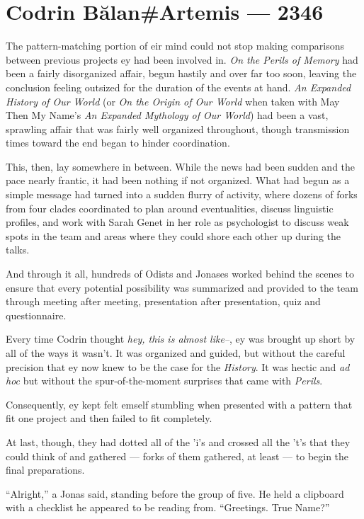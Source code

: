 \hypertarget{codrin-bux103lanartemis-2346}{%
\chapter{Codrin Bălan\#Artemis — 2346}\label{codrin-bux103lanartemis-2346}}

The pattern-matching portion of eir mind could not stop making comparisons between previous projects ey had been involved in. \emph{On the Perils of Memory} had been a fairly disorganized affair, begun hastily and over far too soon, leaving the conclusion feeling outsized for the duration of the events at hand. \emph{An Expanded History of Our World} (or \emph{On the Origin of Our World} when taken with May Then My Name's \emph{An Expanded Mythology of Our World}) had been a vast, sprawling affair that was fairly well organized throughout, though transmission times toward the end began to hinder coordination.

This, then, lay somewhere in between. While the news had been sudden and the pace nearly frantic, it had been nothing if not organized. What had begun as a simple message had turned into a sudden flurry of activity, where dozens of forks from four clades coordinated to plan around eventualities, discuss linguistic profiles, and work with Sarah Genet in her role as psychologist to discuss weak spots in the team and areas where they could shore each other up during the talks.

And through it all, hundreds of Odists and Jonases worked behind the scenes to ensure that every potential possibility was summarized and provided to the team through meeting after meeting, presentation after presentation, quiz and questionnaire.

Every time Codrin thought \emph{hey, this is almost like--}, ey was brought up short by all of the ways it wasn't. It was organized and guided, but without the careful precision that ey now knew to be the case for the \emph{History}. It was hectic and \emph{ad hoc} but without the spur-of-the-moment surprises that came with \emph{Perils}.

Consequently, ey kept felt emself stumbling when presented with a pattern that fit one project and then failed to fit completely.

At last, though, they had dotted all of the 'i's and crossed all the 't's that they could think of and gathered — forks of them gathered, at least — to begin the final preparations.

``Alright,'' a Jonas said, standing before the group of five. He held a clipboard with a checklist he appeared to be reading from. ``Greetings. True Name?''

